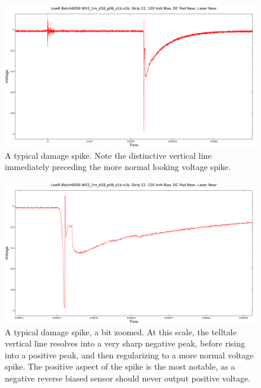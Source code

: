 \documentclass{report}
\begin{document}
            \begin{figure}[h] 
                \includegraphics[height=.4\textheight]{damage_spike}
                \centering
                \caption{ A typical damage spike. Note the distinctive vertical line immediately preceding the more normal looking voltage spike. }
                \label{fig:damage_spike}
            \end{figure}

            \begin{figure}[h] 
                \includegraphics[height=.4\textheight]{damage_spike_zoom}
                \centering
                \caption{ A typical damage spike, a bit zoomed. At this scale, the telltale vertical line resolves into a very sharp negative peak, before rising into a positive peak, and then regularizing to a more normal voltage spike. The positive aspect of the spike is the most notable, as a negative reverse biased sensor should never output positive voltage. }
                \label{fig:damage_spike_zoom}
            \end{figure}
            
\end{document}

